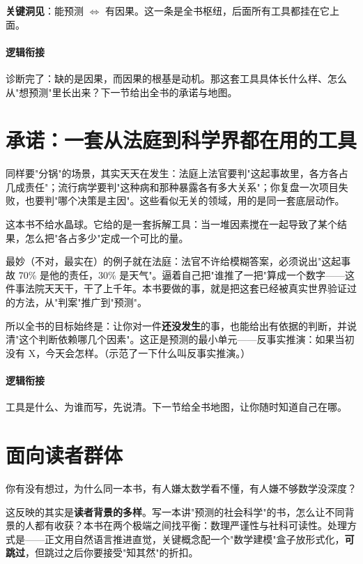 \documentclass[../../main2.tex]{subfiles}
\begin{document}
	\textbf{\Large 关键洞见}：能预测 $\Leftrightarrow$ 有因果。这一条是全书枢纽，后面所有工具都挂在它上面。

	\paragraph*{逻辑衔接}
	诊断完了：缺的是因果，而因果的根基是动机。那这套工具具体长什么样、怎么从"想预测"里长出来？下一节给出全书的承诺与地图。

	\section{承诺：一套从法庭到科学界都在用的工具}

	同样要"分锅"的场景，其实天天在发生：法庭上法官要判"这起事故里，各方各占几成责任"；流行病学要判"这种病和那种暴露各有多大关系"；你复盘一次项目失败，也要判"哪个决策是主因"。这些看似无关的领域，用的是同一套底层动作。

	这本书不给水晶球。它给的是一套拆解工具：当一堆因素搅在一起导致了某个结果，怎么把"各占多少"定成一个可比的量。

	\begin{tcolorbox}[colback=green!5, title=\textit{生活类比}]
		最妙（不对，最实在）的例子就在法庭：法官不许给模糊答案，必须说出"这起事故 70\% 是他的责任，30\% 是天气"。逼着自己把"谁推了一把"算成一个数字——这件事法院天天干，干了上千年。本书要做的事，就是把这套已经被真实世界验证过的方法，从"判案"推广到"预测"。
	\end{tcolorbox}

	所以全书的目标始终是：让你对一件\textbf{还没发生}的事，也能给出有依据的判断，并说清"这个判断依赖哪几个因素"。这正是预测的最小单元——反事实推演：如果当初没有 X，今天会怎样。（示范了一下什么叫反事实推演。）

	\paragraph*{逻辑衔接}
	工具是什么、为谁而写，先说清。下一节给全书地图，让你随时知道自己在哪。

	\section{面向读者群体}

	你有没有想过，为什么同一本书，有人嫌太数学看不懂，有人嫌不够数学没深度？

	这反映的其实是\textbf{读者背景的多样}。写一本讲"预测的社会科学"的书，怎么让不同背景的人都有收获？本书在两个极端之间找平衡：数理严谨性与社科可读性。处理方式是——正文用自然语言推进直觉，关键概念配一个"数学建模"盒子放形式化，\textbf{可跳过}，但跳过之后你要接受"知其然"的折扣。
\end{document}
